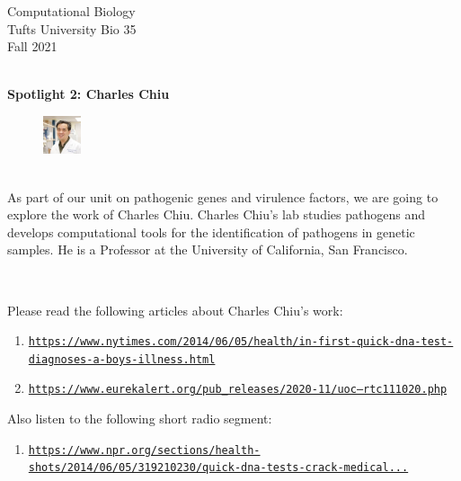 \documentclass{article}
\begin{document}
\begin{flushright}
\BeginAccSupp{}
Computational Biology ~\\
Tufts University Bio 35 ~\\
Fall 2021 ~\\ ~\\
\end{flushright}
\begin{center}{\textbf{\Large{Spotlight 2: Charles Chiu}}}\end{center}

\begin{figure}
\begin{center}
 \includegraphics[width=0.1\textwidth]{images/charles-chiu.jpeg}
 \end{center}
\end{figure}
~\\ As part of our unit on pathogenic genes and virulence factors, we are going to explore the work of Charles Chiu. Charles Chiu's lab studies pathogens and develops computational tools for the identification of pathogens in genetic samples. He is a Professor at the University of California, San Francisco.

~\\
\vspace{-1em}

Please read the following articles about Charles Chiu's work: 
\begin{enumerate}
\item \texttt{\href{https://www.nytimes.com/2014/06/05/health/in-first-quick-dna-test-diagnoses-a-boys-illness.html}{https://www.nytimes.com/2014/06/05/health/in-first-quick-dna-test-diagnoses-a-boys-illness.html}}
\item \texttt{\href{https://www.eurekalert.org/pub_releases/2020-11/uoc--rtc111020.php}{https://www.eurekalert.org/pub\_releases/2020-11/uoc--rtc111020.php}}
\end{enumerate}

Also listen to the following short radio segment:
\begin{enumerate}
\item \texttt{\href{https://www.npr.org/sections/health-shots/2014/06/05/319210230/quick-dna-tests-crack-medical-mysteries-otherwise-missed}{https://www.npr.org/sections/health-shots/2014/06/05/319210230/quick-dna-tests-crack-medical...}}
\end{enumerate}
\end{document}
